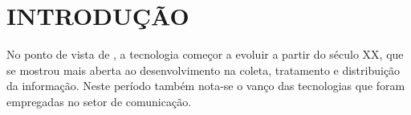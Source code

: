 
\chapter{INTRODUÇÃO}

\par No ponto de vista de , a tecnologia começor a
evoluir a partir do século XX, que se mostrou mais aberta ao desenvolvimento na
coleta, tratamento e distribuição da informação. Neste período também nota-se o
vanço das tecnologias que foram empregadas no setor de comunicação.
